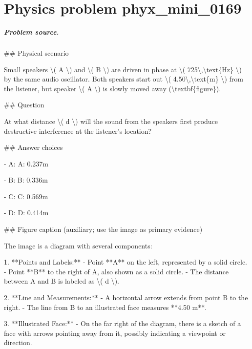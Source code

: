 
\chapter{Physics problem phyx\_mini\_0169}
\label{ch:PhyXMiniProblems_problem_phyx_mini_0169}

\paragraph{Problem source.}
\#\# Physical scenario

Small speakers \textbackslash{}( A \textbackslash{}) and \textbackslash{}( B \textbackslash{}) are driven in phase at \textbackslash{}( 725\textbackslash{},\textbackslash{}text\{Hz\} \textbackslash{}) by the same audio oscillator. Both speakers start out \textbackslash{}( 4.50\textbackslash{},\textbackslash{}text\{m\} \textbackslash{}) from the listener, but speaker \textbackslash{}( A \textbackslash{}) is slowly moved away (\textbackslash{}textbf\{figure\}).

\#\# Question

At what distance \textbackslash{}( d \textbackslash{}) will the sound from the speakers first produce destructive interference at the listener’s location?

\#\# Answer choices

- A: A: 0.237m

- B: B: 0.336m

- C: C: 0.569m

- D: D: 0.414m

\#\# Figure caption (auxiliary; use the image as primary evidence)

The image is a diagram with several components:

1. **Points and Labels:**
   - Point **A** on the left, represented by a solid circle.
   - Point **B** to the right of A, also shown as a solid circle.
   - The distance between A and B is labeled as \textbackslash{}( d \textbackslash{}).

2. **Line and Measurements:**
   - A horizontal arrow extends from point B to the right.
   - The line from B to an illustrated face measures **4.50 m**.

3. **Illustrated Face:**
   - On the far right of the diagram, there is a sketch of a face with arrows pointing away from it, possibly indicating a viewpoint or direction.

